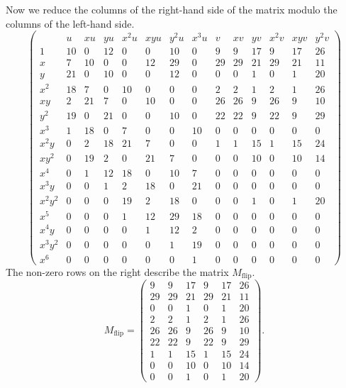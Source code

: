 Now we reduce the columns of the right-hand side of the matrix modulo the columns of the left-hand side.
\[ \left( \begin{array}{r|rrrrrrr|rrrrrr}
         & u & xu & yu & x^2u & xyu & y^2u & x^3u & v & xv & yv & x^2v & xyv & y^2v \\
  \hline
     1 & 10 &  0 & 12 &  0 &  0 & 10 &  0 &  9 &  9 & 17 &  9 & 17 & 26 \\
     x &  7 & 10 &  0 &  0 & 12 & 29 &  0 & 29 & 29 & 21 & 29 & 21 & 11 \\
     y & 21 &  0 & 10 &  0 &  0 & 12 &  0 &  0 &  0 &  1 &  0 &  1 & 20 \\
   x^2 & 18 &  7 &  0 & 10 &  0 &  0 &  0 &  2 &  2 &  1 &  2 &  1 & 26 \\
    xy &  2 & 21 &  7 &  0 & 10 &  0 &  0 & 26 & 26 &  9 & 26 &  9 & 10 \\
   y^2 & 19 &  0 & 21 &  0 &  0 & 10 &  0 & 22 & 22 &  9 & 22 &  9 & 29 \\
   x^3 &  1 & 18 &  0 &  7 &  0 &  0 & 10 &  0 &  0 &  0 &  0 &  0 &  0 \\
  x^2y &  0 &  2 & 18 & 21 &  7 &  0 &  0 &  1 &  1 & 15 &  1 & 15 & 24 \\
  xy^2 &  0 & 19 &  2 &  0 & 21 &  7 &  0 &  0 &  0 & 10 &  0 & 10 & 14 \\
   x^4 &  0 &  1 & 12 & 18 &  0 & 10 &  7 &  0 &  0 &  0 &  0 &  0 &  0 \\
  x^3y &  0 &  0 &  1 &  2 & 18 &  0 & 21 &  0 &  0 &  0 &  0 &  0 &  0 \\
x^2y^2 &  0 &  0 &  0 & 19 &  2 & 18 &  0 &  0 &  0 &  1 &  0 &  1 & 20 \\
   x^5 &  0 &  0 &  0 &  1 & 12 & 29 & 18 &  0 &  0 &  0 &  0 &  0 &  0 \\
  x^4y &  0 &  0 &  0 &  0 &  1 & 12 &  2 &  0 &  0 &  0 &  0 &  0 &  0 \\
x^3y^2 &  0 &  0 &  0 &  0 &  0 &  1 & 19 &  0 &  0 &  0 &  0 &  0 &  0 \\
   x^6 &  0 &  0 &  0 &  0 &  0 &  0 &  1 &  0 &  0 &  0 &  0 &  0 &  0
\end{array} \right) \]
The non-zero rows on the right describe the matrix $M_{\text{flip}}$.
\[ M_{\text{flip}} = \begin{pmatrix}
  9 &  9 & 17 &  9 & 17 & 26 \\
 29 & 29 & 21 & 29 & 21 & 11 \\
  0 &  0 &  1 &  0 &  1 & 20 \\
  2 &  2 &  1 &  2 &  1 & 26 \\
 26 & 26 &  9 & 26 &  9 & 10 \\
 22 & 22 &  9 & 22 &  9 & 29 \\
  1 &  1 & 15 &  1 & 15 & 24 \\
  0 &  0 & 10 &  0 & 10 & 14 \\
  0 &  0 &  1 &  0 &  1 & 20
\end{pmatrix}. \]
